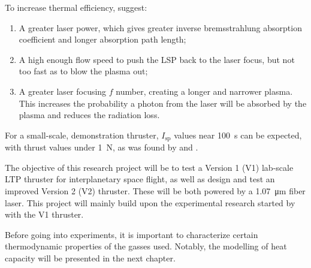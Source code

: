         To increase thermal efficiency, \textcite{chenEmissionSpectroscopyCw1989a} suggest:
        \begin{enumerate}
            \item A greater laser power, which gives greater inverse bremsstrahlung absorption coefficient and longer absorption path length;
            \item A high enough flow speed to push the LSP back to the laser focus, but not too fast as to blow the plasma out;
            \item A greater laser focusing $f$ number, creating a longer and narrower plasma. This increases the probability a photon from the laser will be absorbed by the plasma and reduces the radiation loss.
        \end{enumerate}

        For a small-scale, demonstration thruster, $I_\mathrm{sp}$ values near \qty{100}{s} can be expected, with thrust values under \qty{1}{N}, as was found by \textcite{toyodaThrustPerformanceCW2002} and \textcite{takanoDemonstrationDiodeLasersustained}.
        
        The objective of this research project will be to test a Version 1 (V1) lab-scale LTP thruster for interplanetary space flight, as well as design and test an improved Version 2 (V2) thruster. These will be both powered by a \qty{1.07}{μm} fiber laser. This project will mainly build upon the experimental research started by \textcite{duplayArgonLaserPlasmaThruster2024a} with the V1 thruster.

        
        Before going into experiments, it is important to characterize certain thermodynamic properties of the gasses used. Notably, the modelling of heat capacity will be presented in the next chapter.
